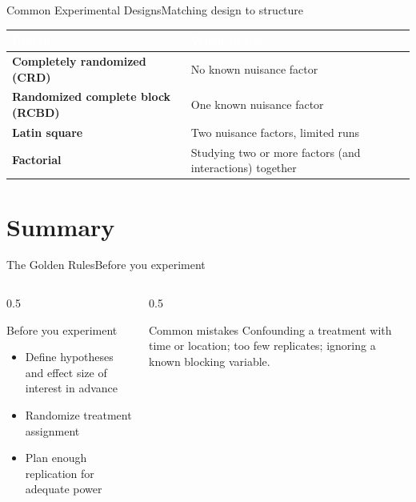 \documentclass[aspectratio=169,11pt]{beamer}
\begin{document}
\begin{frame}{Common Experimental Designs}{Matching design to structure}
  \small
  \renewcommand{\arraystretch}{1.3}
  \begin{center}
  \begin{tabularx}{\textwidth}{@{}>{\bfseries}l >{\raggedright\arraybackslash}X@{}}
    \toprule
    \rowcolor{PrimaryDark}
    \textcolor{white}{Design} & \textcolor{white}{When to use} \\
    \midrule
    Completely randomized (CRD) & No known nuisance factor \\
    \rowcolor{PrimaryLight!25}
    Randomized complete block (RCBD) & One known nuisance factor \\
    Latin square & Two nuisance factors, limited runs \\
    \rowcolor{PrimaryLight!25}
    Factorial & Studying two or more factors (and interactions) together \\
    \bottomrule
  \end{tabularx}
  \end{center}
\end{frame}

\section{Summary}

\begin{frame}{The Golden Rules}{Before you experiment}
  \begin{columns}[T]
    \begin{column}{0.5\textwidth}
      \begin{block}{Before you experiment}
        \small
        \begin{itemize}
          \item Define hypotheses and effect size of interest in advance
          \item Randomize treatment assignment
          \item Plan enough replication for adequate power
        \end{itemize}
      \end{block}
    \end{column}
    \begin{column}{0.5\textwidth}
      \begin{alertblock}{Common mistakes}
        \small Confounding a treatment with time or location; too few
        replicates; ignoring a known blocking variable.
      \end{alertblock}
    \end{column}
  \end{columns}
\end{frame}
\end{document}
